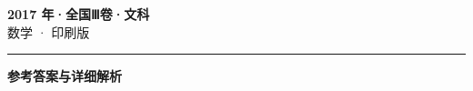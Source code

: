 \documentclass[zihao=5, a4paper]{ctexart}
\begin{document}
\begin{center}
  {\Large\bfseries 2017 年·全国Ⅲ卷·文科}\\[4pt]
  {\large 数学 · 印刷版}
\end{center}
\medskip
{}

\par\bigskip\hrule\bigskip
{}
\begin{center}{\large\bfseries 参考答案与详细解析}\end{center}
\smallskip

\end{document}
